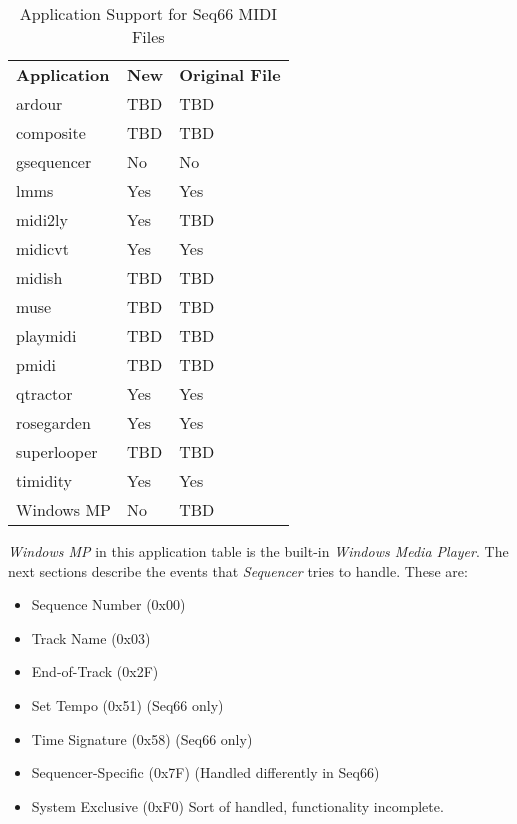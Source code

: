    \begin{table}
      \centering
      \caption{Application Support for Seq66 MIDI Files}
      \label{table:midi_file_support_table}
      \begin{tabular}{l l l}
         \textbf{Application}  &
            \textbf{New} & 
            \textbf{Original File} \\
         ardour       & TBD       & TBD \\
         composite    & TBD       & TBD \\
         gsequencer   & No        & No  \\
         lmms         & Yes       & Yes \\
         midi2ly      & Yes       & TBD \\
         midicvt      & Yes       & Yes \\
         midish       & TBD       & TBD \\
         muse         & TBD       & TBD \\
         playmidi     & TBD       & TBD \\
         pmidi        & TBD       & TBD \\
         qtractor     & Yes       & Yes \\
         rosegarden   & Yes       & Yes \\
         superlooper  & TBD       & TBD \\
         timidity     & Yes       & Yes \\
         Windows MP   & No        & TBD \\
      \end{tabular}
   \end{table}

   \textsl{Windows MP} in this application table is the
   built-in \textsl{Windows Media Player}.
   The next sections describe the events that \textsl{Sequencer} tries to
   handle.  These are:

   \begin{itemize}
      \item Sequence Number (0x00)
      \item Track Name (0x03)
      \item End-of-Track (0x2F)
      \item Set Tempo (0x51) (Seq66 only)
      \item Time Signature (0x58) (Seq66 only)
      \item Sequencer-Specific (0x7F) (Handled differently in Seq66)
      \item System Exclusive (0xF0) Sort of handled, functionality incomplete.
   \end{itemize}


